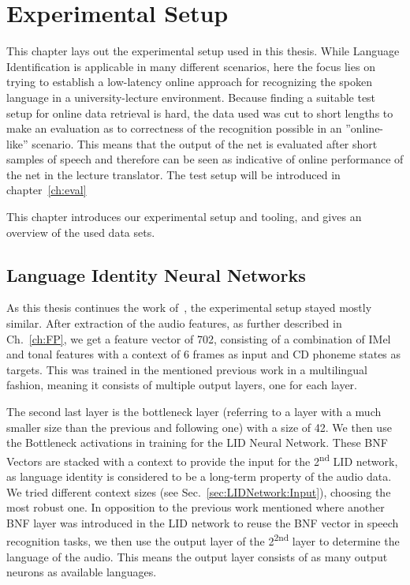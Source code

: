




\chapter{Experimental Setup}
\label{ch:LITasks}

This chapter lays out the experimental setup used in this thesis. While Language Identification is applicable in many different scenarios, here the focus lies on trying to establish a low-latency online approach for recognizing the spoken language in a university-lecture environment. Because finding a suitable test setup for online data retrieval is hard, the data used was cut to short lengths to make an evaluation as to correctness of the recognition possible in an ''online-like'' scenario. 
This means that the output of the net is evaluated after short samples of speech and therefore can be seen as indicative of online performance of the net in the lecture translator. The test setup will be introduced in chapter~\ref{ch:eval}


This chapter introduces our experimental setup and tooling, and gives an overview of the used data sets.

\section{Language Identity Neural Networks}
\label{sec:LITasks:GS}

As this thesis continues the work of~\cite{Mueller2016b}, the experimental setup stayed mostly similar. After extraction of the audio features, as further described in Ch.~\ref{ch:FP}, we get a feature vector of 702, consisting of a combination of IMel and tonal features with a context of 6 frames as input and CD phoneme states as targets. This was trained in the mentioned previous work in a multilingual fashion, meaning it consists of multiple output layers, one for each layer.

The second last layer is the bottleneck layer (referring to a layer with a much smaller size than the previous and following one) with a size of 42. We then use the Bottleneck activations in training for the LID Neural Network. These BNF Vectors are stacked with a context to provide the input for the 2\textsuperscript{nd} LID network, as language identity is considered to be a long-term property of the audio data. We tried different context sizes (see Sec.~\ref{sec:LIDNetwork:Input}), choosing the most robust one.  In opposition to the previous work mentioned where another BNF layer was introduced in the LID network to reuse the BNF vector in speech recognition tasks, we then use the output layer of the 2\textsuperscript{2nd} layer to determine the language of the audio. This means the output layer consists of as many output neurons as available languages.

